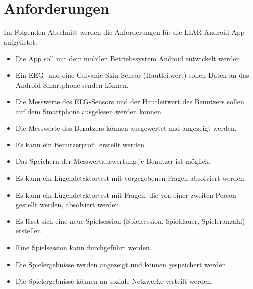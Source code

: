    	\section{Anforderungen}
   	Im Folgenden Abschnitt werden die Anforderungen für die LIAR Android App aufgelistet.
	\begin{itemize}
	\item{}Die App soll mit dem mobilen Betriebssystem Android entwickelt werden.
	\item{}Ein EEG- und eine Galvanic Skin Sensor (Hautleitwert) sollen Daten an das Android Smartphone senden können.
	\item{}Die Messwerte des EEG-Sensors und der Hautleitwert des Benutzers sollen auf dem Smartphone ausgelesen werden können.
	\item{}Die Messwerte des Benutzers können ausgewertet und angezeigt werden.
	\item{}Es kann ein Benutzerprofil erstellt werden.
	\item{}Das Speichern der Messwertauswertung je Benutzer ist möglich.
	\item{}Es kann ein Lügendetektortest mit vorgegebenen Fragen absolviert werden.
	\item{}Es kann ein Lügendetektortest mit Fragen, die von einer zweiten Person gestellt werden, absolviert werden.
	\item{}Es lässt sich eine neue Spielsession (Spielsession, Spieldauer, Spieleranzahl) erstellen.
	\item{}Eine Spielsession kann durchgeführt werden.
	\item{}Die Spielergebnisse werden angezeigt und können gespeichert werden.
	\item{}Die Spielergebnisse können an soziale Netzwerke verteilt werden.
	\end{itemize}		
